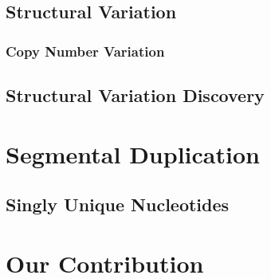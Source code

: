 \subsection{Structural Variation}
\subsubsection{Copy Number Variation}
\subsection{Structural Variation Discovery}

\section{Segmental Duplication}
\subsection{Singly Unique Nucleotides}
\section{Our Contribution}
\newpage
